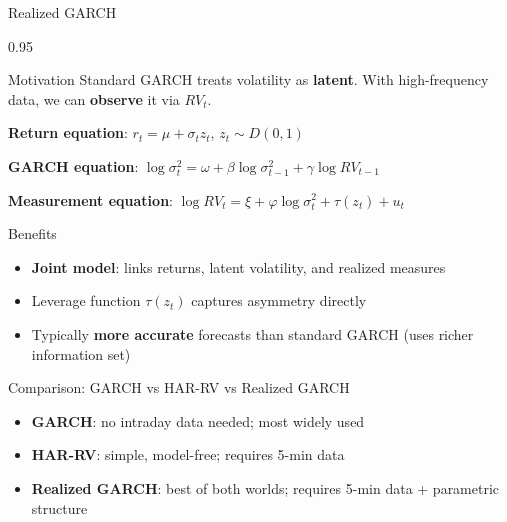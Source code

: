 \documentclass[9pt, aspectratio=169, t]{beamer}
\begin{document}
\begin{frame}{Realized GARCH}
    \begin{cminipage}{0.95\textwidth}
    \scriptsize
    \vspace{-0.3cm}
    \begin{block}{Motivation}
        Standard GARCH treats volatility as \textbf{latent}. With high-frequency data, we can \textbf{observe} it via $RV_t$.
    \end{block}
    \vspace{-0.15cm}
    \begin{defn}
        \textbf{Return equation}: $r_t = \mu + \sigma_t z_t$, \quad $z_t \sim D(0,1)$

        \textbf{GARCH equation}: $\log \sigma_t^2 = \omega + \beta \log \sigma_{t-1}^2 + \gamma \log RV_{t-1}$

        \textbf{Measurement equation}: $\log RV_t = \xi + \varphi \log \sigma_t^2 + \tau(z_t) + u_t$
    \end{defn}
    \vspace{-0.15cm}
    \begin{exampleblock}{Benefits}
        \begin{itemize}\setlength{\itemsep}{0pt}
            \item \textbf{Joint model}: links returns, latent volatility, and realized measures
            \item Leverage function $\tau(z_t)$ captures asymmetry directly
            \item Typically \textbf{more accurate} forecasts than standard GARCH (uses richer information set)
        \end{itemize}
    \end{exampleblock}
    \vspace{-0.15cm}
    \begin{alertblock}{Comparison: GARCH vs HAR-RV vs Realized GARCH}
        \begin{itemize}\setlength{\itemsep}{0pt}
            \item \textbf{GARCH}: no intraday data needed; most widely used
            \item \textbf{HAR-RV}: simple, model-free; requires 5-min data
            \item \textbf{Realized GARCH}: best of both worlds; requires 5-min data + parametric structure
        \end{itemize}
    \end{alertblock}
    \end{cminipage}
\end{frame}
\end{document}
